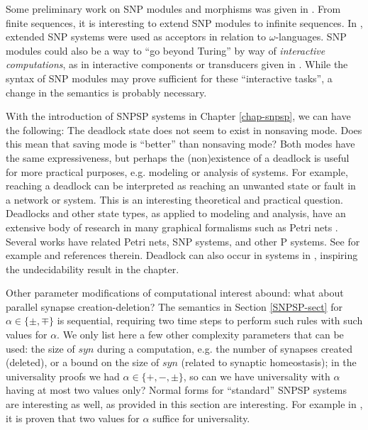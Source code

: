 Some preliminary work on SNP modules and morphisms was given in \cite{acmc2012}.
From finite sequences, it is interesting to extend SNP modules to infinite sequences.
In \cite{snp-omega}, extended SNP systems %
were used as acceptors in relation to $\omega$-languages.
SNP modules could also be a way to ``go beyond Turing'' by way of \textit{interactive computations}, as in {interactive} components or transducers given in \cite{interact-book}.
While the syntax of SNP modules may prove sufficient for these ``interactive tasks'', a change in the semantics is probably necessary.


With the introduction of SNPSP systems in Chapter \ref{chap-snpsp}, we can have the following:
The deadlock state does not seem to exist in nonsaving mode. Does this mean that saving mode is ``better'' than nonsaving mode? Both modes have the same expressiveness, but perhaps the (non)existence of a deadlock is useful for more practical purposes, e.g.  modeling or analysis of systems. For example, reaching a deadlock can be interpreted as reaching an unwanted state or fault in a network or system. This is an interesting theoretical and practical question. Deadlocks and other state types, as applied to modeling and analysis, have an extensive body of research in many graphical formalisms such as Petri nets \cite{murata}\cite{petri-lect}. Several works have related Petri nets, SNP systems, and other P systems. See for example \cite{cabarle-snp-petri} and references therein. Deadlock can also occur in systems in \cite{paun-astro}, inspiring the undecidability result in the chapter.


Other parameter modifications of computational interest abound: what about parallel synapse creation-deletion? The semantics in Section \ref{SNPSP-sect} for $ \alpha \in \{\pm, \mp\}$ is sequential, requiring two time steps to perform such rules with such values for $ \alpha$. 
We only list here a few other complexity parameters that can be used: the size of $syn$ during a computation, e.g. the number of synapses created (deleted), or  a bound on the size of $syn$ (related to synaptic homeostasis); in the universality proofs we had $ \alpha \in \{+,-, \pm\}$, so can we have universality with $ \alpha$ having at most two values only? Normal forms for ``standard'' SNPSP systems are interesting as well, as provided in this section are interesting.
For example in \cite{norm-snpsp}, it is proven that two values for $\alpha$ suffice for universality.


